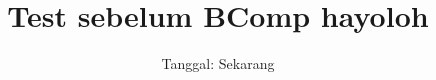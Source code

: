 \documentclass[a4paper, 12pt]{scrartcl}
\title{Test sebelum BComp hayoloh}
\date{Tanggal: Sekarang}
\author{}
\begin{document}
\maketitle

\renewcommand*\contentsname{Daftar Isi}
\tableofcontents

\newpage



\end{document}
